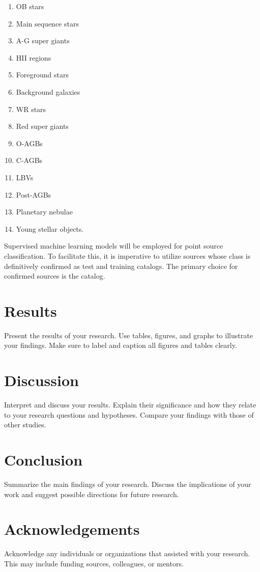 \documentclass[a4paper, 15pt,usenatbib]{article}
\begin{document}
\begin{enumerate}
  \item OB stars
  \item Main sequence stars
  \item A-G super giants
  \item HII regions
  \item Foreground stars
  \item Background galaxies
  \item WR stars
  \item Red super giants
  \item O-AGBs
  \item C-AGBs
  \item LBVs
  \item Post-AGBs
  \item Planetary nebulae
  \item Young stellar objects. 
\end{enumerate}  

Supervised machine learning models will be employed for point source classification. To facilitate this, it is imperative to utilize sources whose class is definitively confirmed as test and training catalogs. The primary choice for confirmed sources is the \citet{Jones17} catalog.

\section{Results}
Present the results of your research. Use tables, figures, and graphs to illustrate your findings. Make sure to label and caption all figures and tables clearly.

\section{Discussion}
Interpret and discuss your results. Explain their significance and how they relate to your research questions and hypotheses. Compare your findings with those of other studies.

\section{Conclusion}
Summarize the main findings of your research. Discuss the implications of your work and suggest possible directions for future research.

\section{Acknowledgements}
Acknowledge any individuals or organizations that assisted with your research. This may include funding sources, colleagues, or mentors.
\end{document}
